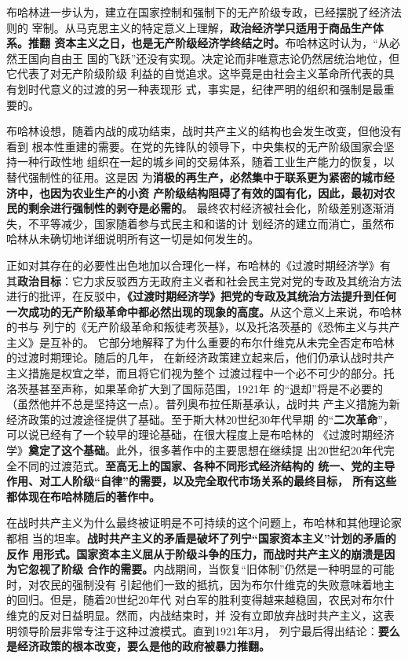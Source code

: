 布哈林进一步认为，建立在国家控制和强制下的无产阶级专政，已经摆脱了经济法则的
宰制。从马克思主义的特定意义上理解，\textbf{政治经济学只适用于商品生产体系。推翻
资本主义之日，也是无产阶级经济学终结之时。}布哈林这时认为，“从必然王国向自由王
国的飞跃”还没有实现。决定论而非唯意志论仍然居统治地位，但它代表了对无产阶级阶级
利益的自觉追求。这毕竟是由社会主义革命所代表的具有划时代意义的过渡的另一种表现形
式，事实是，纪律严明的组织和强制是最重要的。

布哈林设想，随着内战的成功结束，战时共产主义的结构也会发生改变，但他没有看到
根本性重建的需要。在党的先锋队的领导下，中央集权的无产阶级国家会坚持一种行政性地
组织在一起的城乡间的交易体系，随着工业生产能力的恢复，以替代强制性的征用。这是因
为\textbf{消极的再生产，必然集中于联系更为紧密的城市经济中，也因为农业生产的小资
产阶级结构阻碍了有效的国有化，因此，最初对农民的剩余进行强制性的剥夺是必需的}。
最终农村经济被社会化，阶级差别逐渐消失，不平等减少，国家随着参与式民主和和谐的计
划经济的建立而消亡，虽然布哈林从未确切地详细说明所有这一切是如何发生的。

正如对其存在的必要性出色地加以合理化一样，布哈林的《过渡时期经济学》有
其\textbf{政治目标}：它力求反驳西方无政府主义者和社会民主党对党的专政及其统治方法
进行的批评，在反驳中，\textbf{《过渡时期经济学》把党的专政及其统治方法提升到任何
  一次成功的无产阶级革命中都必然出现的现象的高度。}从这个意义上来说，布哈林的书与
列宁的《无产阶级革命和叛徒考茨基》，以及托洛茨基的《恐怖主义与共产主义》是互补的。
它部分地解释了为什么重要的布尔什维克从未完全否定布哈林的过渡时期理论。随后的几年，
在新经济政策建立起来后，他们仍承认战时共产主义措施是权宜之举，而且将它们视为整个
过渡过程中一个必不可少的部分。托洛茨基甚至声称，如果革命扩大到了国际范围，1921年
的“退却”将是不必要的（虽然他并不总是坚持这一点）。普列奥布拉任斯基承认，战时共
产主义措施为新经济政策的过渡途径提供了基础。至于斯大林20世纪30年代早期
的“\textbf{二次革命}”，可以说已经有了一个较早的理论基础，在很大程度上是布哈林的
《过渡时期经济学》\textbf{奠定了这个基础}。此外，很多著作中的主要思想在继续提
出20世纪20年代完全不同的过渡范式。\textbf{至高无上的国家、各种不同形式经济结构的
  统一、党的主导作用、对工人阶级“自律”的需要，以及完全取代市场关系的最终目标，
  所有这些都体现在布哈林随后的著作中。}

在战时共产主义为什么最终被证明是不可持续的这个问题上，布哈林和其他理论家都相
当的坦率。\textbf{战时共产主义的矛盾是破坏了列宁“国家资本主义”计划的矛盾的反作
用形式。国家资本主义屈从于阶级斗争的压力，而战时共产主义的崩溃是因为它忽视了阶级
合作的需要。}内战期间，当恢复“旧体制”仍然是一种明显的可能时，对农民的强制没有
引起他们一致的抵抗，因为布尔什维克的失败意味着地主的回归。但是，随着20世纪20年代
对白军的胜利变得越来越稳固，农民对布尔什维克的反对日益明显。然而，内战结束时，并
没有立即放弃战时共产主义，这表明领导阶层非常专注于这种过渡模式。直到1921年3月，
列宁最后得出结论：\textbf{要么是经济政策的根本改变，要么是他的政府被暴力推翻。}

